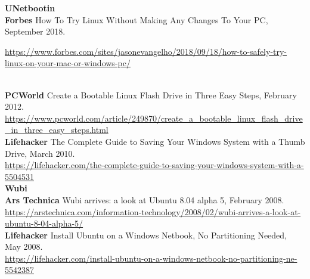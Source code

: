 \documentclass[10pt,A4]{article}
\begin{document}
\textcolor{sectcol}{\textbf{UNetbootin}}\\

\textbf{Forbes} How To Try Linux Without Making Any Changes To Your PC, September 2018.\\
\begin{small}
\url{https://www.forbes.com/sites/jasonevangelho/2018/09/18/how-to-safely-try-linux-on-your-mac-or-windows-pc/}
\end{small}\\

\textbf{PCWorld} Create a Bootable Linux Flash Drive in Three Easy Steps, February 2012.\\
\url{https://www.pcworld.com/article/249870/create_a_bootable_linux_flash_drive_in_three_easy_steps.html}\\

\textbf{Lifehacker} The Complete Guide to Saving Your Windows System with a Thumb Drive, March 2010.\\
\url{https://lifehacker.com/the-complete-guide-to-saving-your-windows-system-with-a-5504531}\\



\textcolor{sectcol}{\textbf{Wubi}}\\

\textbf{Ars Technica} Wubi arrives: a look at Ubuntu 8.04 alpha 5, February 2008.\\
\url{https://arstechnica.com/information-technology/2008/02/wubi-arrives-a-look-at-ubuntu-8-04-alpha-5/}\\

\textbf{Lifehacker} Install Ubuntu on a Windows Netbook, No Partitioning Needed, May 2008.\\
\url{https://lifehacker.com/install-ubuntu-on-a-windows-netbook-no-partitioning-ne-5542387}\\
\end{document}
